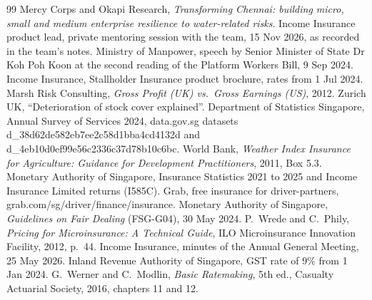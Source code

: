 \documentclass[11pt,a4paper]{article}
\begin{document}
{\begin{thebibliography}{99}
 Mercy Corps and Okapi Research, \emph{Transforming Chennai: building micro, small and medium enterprise resilience to water-related risks}.
 Income Insurance product lead, private mentoring session with the team, 15 Nov 2026, as recorded in the team's notes.
 Ministry of Manpower, speech by Senior Minister of State Dr Koh Poh Koon at the second reading of the Platform Workers Bill, 9 Sep 2024.
 Income Insurance, Stallholder Insurance product brochure, rates from 1 Jul 2024.
 Marsh Risk Consulting, \emph{Gross Profit (UK) vs.\ Gross Earnings (US)}, 2012.
 Zurich UK, ``Deterioration of stock cover explained''.
 Department of Statistics Singapore, Annual Survey of Services 2024, data.gov.sg datasets d\_38d62de582eb7ee2c58d1bba4cd4132d and d\_4eb10d0ef99e56c2336c37d78b10c6bc.
 World Bank, \emph{Weather Index Insurance for Agriculture: Guidance for Development Practitioners}, 2011, Box 5.3.
 Monetary Authority of Singapore, Insurance Statistics 2021 to 2025 and Income Insurance Limited returns (I585C).
 Grab, free insurance for driver-partners, grab.com/sg/driver/finance/insurance.
 Monetary Authority of Singapore, \emph{Guidelines on Fair Dealing} (FSG-G04), 30 May 2024.
 P.~Wrede and C.~Phily, \emph{Pricing for Microinsurance: A Technical Guide}, ILO Microinsurance Innovation Facility, 2012, p.~44.
 Income Insurance, minutes of the Annual General Meeting, 25 May 2026.
 Inland Revenue Authority of Singapore, GST rate of 9\% from 1 Jan 2024.
 G.~Werner and C.~Modlin, \emph{Basic Ratemaking}, 5th ed., Casualty Actuarial Society, 2016, chapters 11 and 12.
\end{thebibliography}
}
\end{document}
